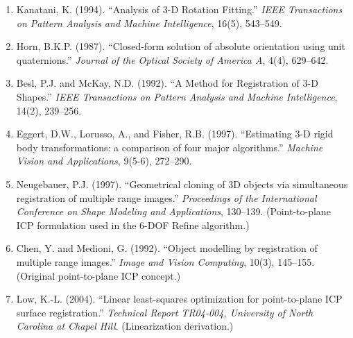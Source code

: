 \documentclass[11pt,a4paper]{article}
\begin{document}
\begin{enumerate}
    \item Kanatani, K. (1994). ``Analysis of 3-D Rotation Fitting.'' \textit{IEEE Transactions on Pattern Analysis and Machine Intelligence}, 16(5), 543--549.

    \item Horn, B.K.P. (1987). ``Closed-form solution of absolute orientation using unit quaternions.'' \textit{Journal of the Optical Society of America A}, 4(4), 629--642.

    \item Besl, P.J. and McKay, N.D. (1992). ``A Method for Registration of 3-D Shapes.'' \textit{IEEE Transactions on Pattern Analysis and Machine Intelligence}, 14(2), 239--256.

    \item Eggert, D.W., Lorusso, A., and Fisher, R.B. (1997). ``Estimating 3-D rigid body transformations: a comparison of four major algorithms.'' \textit{Machine Vision and Applications}, 9(5-6), 272--290.

    \item Neugebauer, P.J. (1997). ``Geometrical cloning of 3D objects via simultaneous registration of multiple range images.'' \textit{Proceedings of the International Conference on Shape Modeling and Applications}, 130--139. (Point-to-plane ICP formulation used in the 6-DOF Refine algorithm.)

    \item Chen, Y. and Medioni, G. (1992). ``Object modelling by registration of multiple range images.'' \textit{Image and Vision Computing}, 10(3), 145--155. (Original point-to-plane ICP concept.)

    \item Low, K.-L. (2004). ``Linear least-squares optimization for point-to-plane ICP surface registration.'' \textit{Technical Report TR04-004, University of North Carolina at Chapel Hill}. (Linearization derivation.)
\end{enumerate}
\end{document}
